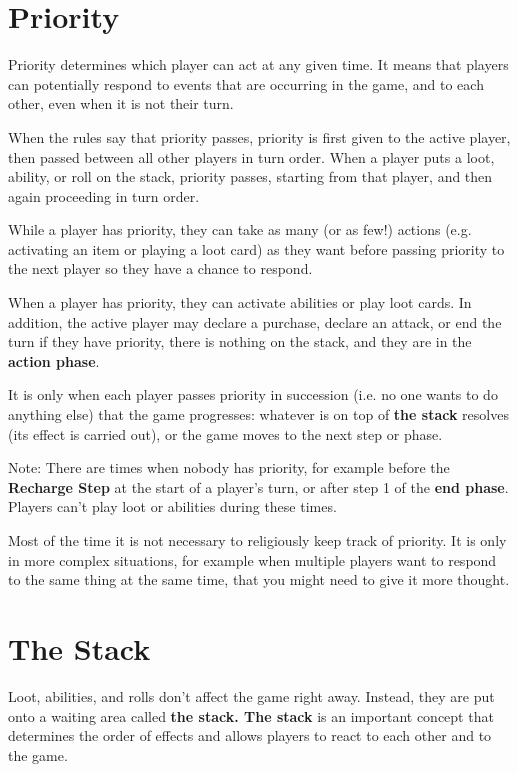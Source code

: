 \documentclass[10pt, a4paper, twoside]{article} %
\begin{document}
    \section{Priority}
    \label{priority}
    Priority determines which player can act at any given time. It means that players can potentially respond to events that are occurring in the game, and to each other, even when it is not their turn.

    When the rules say that priority passes, priority is first given to the active player, then passed between all other players in turn order. When a player puts a loot, ability, or roll on the stack, priority passes, starting from that player, and then again proceeding in turn order.

    While a player has priority, they can take as many (or as few!) actions (e.g. activating an item or playing a loot card) as they want before passing priority to the next player so they have a chance to respond.

    When a player has priority, they can activate abilities or play loot cards. In addition, the active player may declare a purchase, declare an attack, or end the turn if they have priority, there is nothing on the stack, and they are in the \textbf{action phase}.

    It is only when each player passes priority in succession (i.e. no one wants to do anything else) that the game progresses: whatever is on top of \textbf{the stack} resolves (its effect is carried out), or the game moves to the next step or phase.

    Note: There are times when nobody has priority, for example before the \textbf{Recharge Step} at the start of a player’s turn, or after step 1 of the \textbf{end phase}. Players can’t play loot or abilities during these times.

    Most of the time it is not necessary to religiously keep track of priority. It is only in more complex situations, for example when multiple players want to respond to the same thing at the same time, that you might need to give it more thought.

    \section{The Stack}
    \label{stack}
    Loot, abilities, and rolls don’t affect the game right away. Instead, they are put onto a waiting area called \textbf{the stack. The stack} is an important concept that determines the order of effects and allows players to react to each other and to the game.
\end{document}
